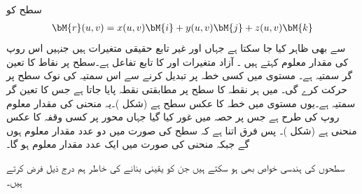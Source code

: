 سطح  کو 
\begin{align}\label{مساوات_خطی_تکمل_سطح_مقدار_معلوم_روپ}
\bM{r}(u,v)=x(u,v)\bM{i}+y(u,v)\bM{j}+z(u,v)\bM{k}
\end{align}
سے بھی ظاہر کیا جا سکتا ہے جہاں  اور  غیر تابع حقیقی متغیرات ہیں جنہیں اس روپ کی مقدار معلوم کہتے ہیں ۔  آزاد متغیرات  اور  کا تابع تفاعل  ہے۔سطح  پر نقاط کا تعین گر سمتیہ  ہے۔ مستوی  میں کسی خطہ  پر  تبدیل کرنے سے اس سمتیہ کی نوک سطح  پر حرکت کرے گی۔  میں ہر نقطہ  کا سطح  پر مطابقتی نقطہ پایا جاتا ہے جس کا تعین گر سمتیہ  ہے۔یوں مستوی  میں خطہ  کا عکس سطح   ہے (شکل )۔یہ منحنی  کی مقدار معلوم روپ  کی طرح ہے جس پر حصہ  میں غور کیا گیا جہاں  محور  پر کسی وقفہ کا عکس منحنی  ہے (شکل )۔ پس فرق اتنا ہے کہ سطح کی صورت میں دو عدد مقدار معلوم ہوں گے جبکہ منحنی کی صورت میں ایک عدد مقدار معلوم ہو گا۔

سطحوں کی  ہندسی خواص بھی ہو سکتے ہیں جن کو یقینی بنانے کی خاطر ہم درج ذیل فرض کرتے ہیں۔

